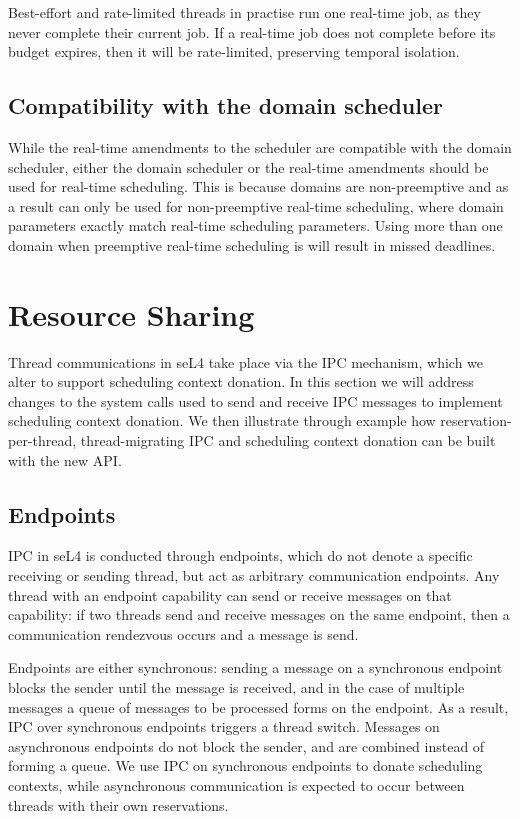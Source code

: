 Best-effort and rate-limited threads in practise run one real-time job, as they never complete their current job.
If a real-time job does not complete before its budget expires, then it will be rate-limited, preserving temporal isolation.

\subsection{Compatibility with the domain scheduler}

While the real-time amendments to the scheduler are compatible with the domain scheduler, either the domain scheduler or the real-time amendments should be used for real-time scheduling.
This is because domains are non-preemptive and as a result can only be used for non-preemptive real-time scheduling, where domain parameters exactly match real-time scheduling parameters.
Using more than one domain when preemptive real-time scheduling is will result in missed deadlines.



\section{Resource Sharing}

Thread communications in seL4 take place via the IPC mechanism, which we alter to support scheduling context donation.
In this section we will address changes to the system calls used to send and receive IPC messages to implement scheduling context donation.
We then illustrate through example how reservation-per-thread, thread-migrating IPC and scheduling context donation can be built with the new \gls{API}.

\subsection{Endpoints}

\gls{IPC} in seL4 is conducted through endpoints, which do not denote a specific receiving or sending thread, but act as arbitrary communication endpoints.
Any thread with an endpoint capability can send or receive messages on that capability: if two threads send and receive messages on the same endpoint, then a communication rendezvous occurs and a message is send.

Endpoints are either synchronous: sending a message on a synchronous endpoint blocks the sender until the message is received, and in the case of multiple messages a queue of messages to be processed forms on the endpoint.
As a result, IPC over synchronous endpoints triggers a thread switch.
Messages on asynchronous endpoints do not block the sender, and are combined instead of forming a queue.
We use IPC on synchronous endpoints to donate scheduling contexts, while asynchronous communication is expected to occur between threads with their own reservations.

